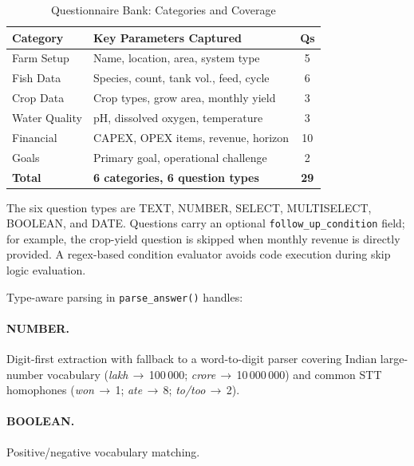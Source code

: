 \documentclass[runningheads]{llncs}
\begin{document}
\begin{table}[tbp]
  \caption{Questionnaire Bank: Categories and Coverage}
  \label{tab:qbank}
  \centering
  \small
  \setlength{\tabcolsep}{5pt}
  \begin{tabular}{llc}
    \toprule
    \textbf{Category} & \textbf{Key Parameters Captured} & \textbf{Qs} \\
    \midrule
    Farm Setup     & Name, location, area, system type          & 5  \\
    Fish Data      & Species, count, tank vol., feed, cycle     & 6  \\
    Crop Data      & Crop types, grow area, monthly yield       & 3  \\
    Water Quality  & pH, dissolved oxygen, temperature          & 3  \\
    Financial      & CAPEX, OPEX items, revenue, horizon        & 10 \\
    Goals          & Primary goal, operational challenge        & 2  \\
    \midrule
    \textbf{Total} & \textbf{6 categories, 6 question types}    & \textbf{29} \\
    \bottomrule
  \end{tabular}
\end{table}

The six question types are TEXT, NUMBER, SELECT, MULTISELECT,
BOOLEAN, and DATE. Questions carry an optional
\texttt{follow\_up\_condition} field; for example, the crop-yield
question is skipped when monthly revenue is directly provided.
A regex-based condition evaluator avoids code execution during
skip logic evaluation.

Type-aware parsing in \texttt{parse\_answer()} handles:

\paragraph{NUMBER.}
Digit-first extraction with fallback to a word-to-digit parser
covering Indian large-number vocabulary
(\emph{lakh}\,$\rightarrow$\,100\,000;
\emph{crore}\,$\rightarrow$\,10\,000\,000)
and common STT homophones
(\emph{won}\,$\rightarrow$\,1; \emph{ate}\,$\rightarrow$\,8;
\emph{to/too}\,$\rightarrow$\,2).

\paragraph{BOOLEAN.}
Positive/negative vocabulary matching.
\end{document}
